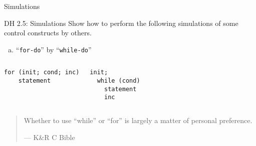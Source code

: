 \begin{frame}{}
  \centerline{\LARGE Simulations}
\end{frame}

\begin{frame}[fragile]{}
  \begin{exampleblock}{DH 2.5: Simulations}
    Show how to perform the following simulations of some control constructs by others.
    \begin{enumerate}[(a)]
      \item ``\texttt{for-do}'' by ``\texttt{while-do}''
    \end{enumerate}
  \end{exampleblock}

  \begin{columns}
      \begin{lstlisting}[style = Cstyle, backgroundcolor = \color{teal!10!lightgray}]
  for (init; cond; inc)
    statement
      \end{lstlisting}
    \pause
      \begin{lstlisting}[style = Cstyle]
  init;
  while (cond)
    statement
    inc
      \end{lstlisting}
  \end{columns}

  \vspace{0.50cm}
  \pause
  \begin{quote}
    Whether to use ``while'' or ``for'' is largely a matter of personal preference.
     
    \hfill --- K\&R C Bible
  \end{quote}
\end{frame}

